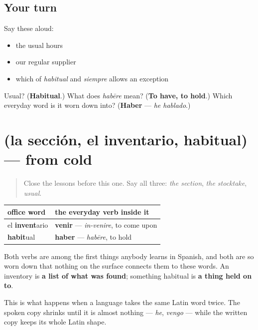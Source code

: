 \subsection*{Your turn}
Say these aloud:

\begin{itemize}
\raggedright
  \item the usual hours
  \item our regular supplier
  \item which of \emph{habitual} and \emph{siempre} allows an exception
\end{itemize}

\begin{tcolorbox}[breakable,colback=teal!4,colframe=teal!35!black,title={Before you move on}]
Usual? (\textbf{Habitual}.) What does \emph{habēre} mean? (\textbf{To have, to hold}.) Which everyday word is it worn down into? (\textbf{Haber} — \emph{he hablado}.)
\end{tcolorbox}
\section[(la sección, el inventario, habitual)]{(la sección, el inventario, habitual) — from cold}

\label{lesson:ES-R459-repaso-stock}



\begin{quote}
Close the lessons before this one. Say all three: \emph{the section}, \emph{the stocktake}, \emph{usual}.
\end{quote}

\begin{grammarlens}[title={Grammar Lens: two everyday verbs, hidden in office words}]
\noindent
\begin{tabularx}{\linewidth}{@{}>{\raggedright\arraybackslash}X>{\raggedright\arraybackslash}X@{}}
\toprule
\textbf{office word} & \textbf{the everyday verb inside it} \\
\midrule
el \textbf{invent}ario & \textbf{venir} — \emph{in-venire}, to come upon \\
\textbf{habit}ual & \textbf{haber} — \emph{habēre}, to hold \\
\bottomrule
\end{tabularx}

Both verbs are among the first things anybody learns in Spanish, and both are so worn down that nothing on the surface connects them to these words. An inventory is \textbf{a list of what was found}; something habitual is \textbf{a thing held on to}.

This is what happens when a language takes the same Latin word twice. The spoken copy shrinks until it is almost nothing — \emph{he}, \emph{vengo} — while the written copy keeps its whole Latin shape.
\end{grammarlens}

